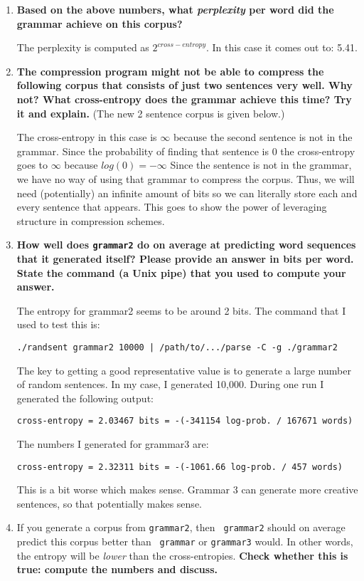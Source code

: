 \documentclass[10pt]{article}
\begin{document}
\begin{enumerate}
\begin{enumerate}
\begin{enumerate}
\item {\bf Based on the above numbers, what {\it perplexity} per word did
  the grammar achieve on this corpus?}
  
 The perplexity is computed as $2^{cross-entropy}$. In this case it comes out to: 5.41.

\item {\bf The compression program might not be able to compress the
    following corpus that consists of just two sentences very well.
    Why not? What cross-entropy does the grammar achieve this time?
    Try it and explain.}  (The new 2 sentence corpus is given below.)

The cross-entropy in this case is $\infty$ because the second sentence is not in the grammar. Since the probability of finding that sentence is 0 the cross-entropy goes to $\infty$ because $log(0) = - \infty$ Since the sentence is not in the grammar, we have no way of using that grammar to compress the corpus. Thus, we will need (potentially) an infinite amount of bits so we can literally store each and every sentence that appears. This goes to show the power of leveraging structure in compression schemes. 

\item {\bf How well does {\tt grammar2} do on average at predicting
    word sequences that it generated itself?  Please provide an answer
    in bits per word.  State the command (a Unix pipe) that you used
    to compute your answer.}

The entropy for grammar2 seems to be around 2 bits. The command that I used to test this is:

{\tt ./randsent grammar2 10000 | /path/to/.../parse -C -g ./grammar2 }

The key to getting a good representative value is to generate a large number of random sentences. In my case, I generated 10,000. During one run I generated the following output:

{\tt cross-entropy = 2.03467 bits = -(-341154 log-prob. / 167671 words)}
 

The numbers I generated for grammar3 are:

{\tt cross-entropy = 2.32311 bits = -(-1061.66 log-prob. / 457 words)}

This is a bit worse which makes sense. Grammar 3 can generate more creative sentences, so that potentially makes sense.



\item If you generate a corpus from {\tt grammar2}, then {\tt
    grammar2} should on average predict this corpus better than {\tt
    grammar} or {\tt grammar3} would. In other words, the entropy will
  be {\it lower} than the cross-entropies. {\bf Check whether this is true:
    compute the numbers and discuss.} \end{enumerate}
\end{enumerate}




\end{enumerate}
\end{document}
